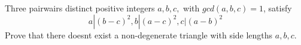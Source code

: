 Three pairwairs distinct positive integers $a,b,c,$ with $gcd(a,b,c)=1$,  satisfy \[a|(b-c)^2 ,b|(a-c)^2 , c|(a-b)^2\]Prove that there doesnt exist a non-degenerate triangle with side lengths $a,b,c.$